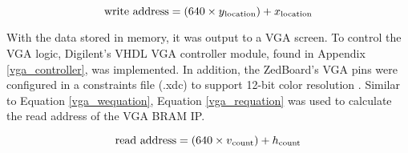 \begin{equation}
	\textrm{write address} = (640\times{}y\textsubscript{location})+ x\textsubscript{location}
	\label{vga_wequation}
\end{equation}

\par
With the data stored in memory, it was output to a VGA screen. To control the VGA logic, Digilent's VHDL VGA controller module, found in Appendix \ref{vga_controller}, was implemented. In addition, the ZedBoard's VGA pins were configured in a constraints file (.xdc) to support 12-bit color resolution \cite{zedboard_datasheet}. Similar to Equation \ref{vga_wequation}, Equation \ref{vga_requation} was used to calculate the read address of the VGA BRAM IP.

\begin{equation}
	\textrm{read address} = (640\times{}v\textsubscript{count})+ h\textsubscript{count}
	\label{vga_requation}
\end{equation}


